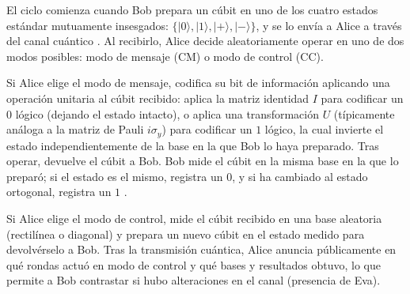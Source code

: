 El ciclo comienza cuando Bob prepara un cúbit en uno de los cuatro estados estándar mutuamente insesgados: $\{|0\rangle, |1\rangle, |+\rangle, |-\rangle\}$, y se lo envía a Alice a través del canal cuántico \citep{lucamarini2005}. Al recibirlo, Alice decide aleatoriamente operar en uno de dos modos posibles: modo de mensaje (CM) o modo de control (CC).

Si Alice elige el modo de mensaje, codifica su bit de información aplicando una operación unitaria al cúbit recibido: aplica la matriz identidad $I$ para codificar un $0$ lógico (dejando el estado intacto), o aplica una transformación $U$ (típicamente análoga a la matriz de Pauli $i\sigma_y$) para codificar un $1$ lógico, la cual invierte el estado independientemente de la base en la que Bob lo haya preparado. Tras operar, devuelve el cúbit a Bob. Bob mide el cúbit en la misma base en la que lo preparó; si el estado es el mismo, registra un $0$, y si ha cambiado al estado ortogonal, registra un $1$ \citep{lucamarini2005}.

Si Alice elige el modo de control, mide el cúbit recibido en una base aleatoria (rectilínea o diagonal) y prepara un nuevo cúbit en el estado medido para devolvérselo a Bob. Tras la transmisión cuántica, Alice anuncia públicamente en qué rondas actuó en modo de control y qué bases y resultados obtuvo, lo que permite a Bob contrastar si hubo alteraciones en el canal (presencia de Eva).

